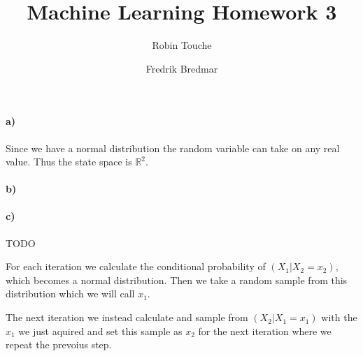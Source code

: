 \documentclass{article}
\author{
  Robin Touche \\
  \and
  Fredrik Bredmar
}
\title{Machine Learning Homework 3}
\begin{document}
\maketitle

\setcounter{section}{1}
\subsection{}
\paragraph{a)}

Since we have a normal distribution the random variable can take on any real
value. Thus the state space is $\mathbb{R}^2$.

\paragraph{b)}


\paragraph{c)}

TODO

For each iteration we calculate the conditional probability of $(X_1 \vert X_2
= x_2)$, which becomes a normal distribution. Then we take a random sample from
this distribution which we will call $x_1$.

The next iteration we instead calculate and sample from $(X_2 \vert X_1 = x_1)$
with the $x_1$ we just aquired and set this sample as $x_2$ for the next
iteration where we repeat the prevoius step.
\end{document}
